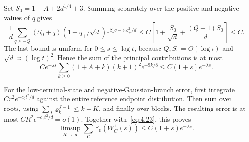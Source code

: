 \documentclass[11pt,letterpaper,reqno]{amsart}
\numberwithin{equation}{section}
\theoremstyle{remark}
\begin{document}
Set $S_0=1+A+2d^{1/4}+3$. Summing separately over the positive and negative values of $q$ gives
\begin{equation}\label{eq:4.32}
\frac1d\sum_{q\ge-Q}(S_0+q)(1+q_+/\sqrt d)
 e^{\beta_kq-c_1q_+^2/d}
\le C\left[1+\frac{S_0}{\sqrt d}+\frac{(Q+1)S_0}{d}\right]\le C.
\end{equation}
The last bound is uniform for $0\le s\le\log t$, because $Q,S_0=O(\log t)$ and $\sqrt d\asymp(\log t)^2$. Hence the sum of the principal contributions is at most
\begin{equation}\label{eq:4.33}
Ce^{-\lambda s}\sum_{k\ge0}(1+A+k)(k+1)^2e^{-9k/8}
\le C(1+s)e^{-\lambda s}.
\end{equation}

For the low-terminal-state and negative-Gaussian-branch error, first integrate $Cr^2e^{-c_0t^2/d}$ against the entire reference endpoint distribution. Then sum over roots, using $\sum_J\varrho_k^{J-1}\le k+K$, and finally over blocks. The resulting error is at most $CR^2e^{-c_1t^2/d}=o(1)$. Together with~\eqref{eq:4.23}, this proves
\begin{equation}\label{eq:4.34}
\limsup_{R\to\infty}\sum_C\mathbb P_0(W_C^+(s))
\le C(1+s)e^{-\lambda s}.
\end{equation}
\end{document}
